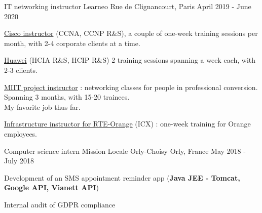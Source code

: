 \begin{cventries}
  \cventry
    {IT networking instructor} %
    {Learneo} %
    {Rue de Clignancourt, Paris} %
    {April 2019 - June 2020} %
    {
      \begin{cvitems} %
      {
        \item {\underline{Cisco instructor} (CCNA, CCNP R\&S), a couple of one-week training sessions per month, with 2-4 corporate clients at a time.}
        \item {\underline{Huawei} (HCIA R\&S, HCIP R\&S) 2 training sessions spanning a week each, with 2-3 clients.}
        \item {\underline{MIIT project instructor} : networking classes for people in professional conversion. Spanning 3 months, with 15-20 trainees.\\My favorite job thus far.}
        \item {\underline{Infrastructure instructor for RTE-Orange} (ICX) : one-week training for Orange employees.}
      }
      \end{cvitems}
    }

  \cventry
    {Computer science intern} %
    {Mission Locale Orly-Choisy} %
    {Orly, France} %
    {May 2018 - July 2018} %
    {
      \begin{cvitems} %
        \item {Development of an SMS appointment reminder app (\textbf{Java JEE - Tomcat, Google API, Vianett API})}
        \item {Internal audit of GDPR compliance}
      \end{cvitems}
    }
\end{cventries}
